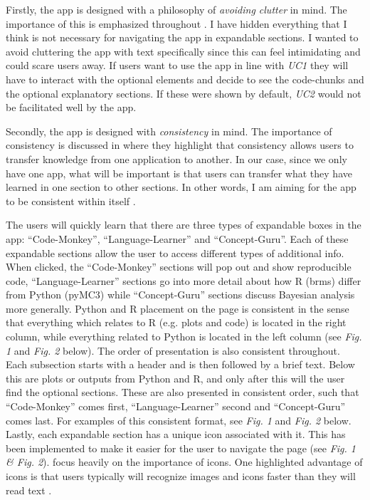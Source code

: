 \documentclass[12pt]{article}
\begin{document}
\vspace{5mm}

Firstly, the app is designed with a philosophy of \emph{avoiding clutter} in mind.
The importance of this is emphasized throughout \textcite{mills1992macintosh}.
I have hidden everything that I think is not necessary for navigating the app
in expandable sections. I wanted to avoid cluttering the
app with text specifically since this can feel intimidating and could scare users away.
If users want to use the app in line with \emph{UC1} they will have to interact with the optional
elements and decide to see the code-chunks and the optional explanatory sections.
If these were shown by default, \emph{UC2} would not be facilitated well by the app.

\vspace{5mm}

Secondly, the app is designed with \emph{consistency} in mind.
The importance of consistency is discussed in
\textcite[7]{mills1992macintosh}
where they highlight that consistency allows users to transfer knowledge from one
application to another. In our case, since we only have one app, what will be important is
that users can transfer what they have learned in one section to other sections.
In other words, I am aiming for the app to be consistent within itself
\autocite[8]{mills1992macintosh}.

\vspace{5mm}

The users will quickly learn that there are three types of expandable boxes in the app:
“Code-Monkey”, “Language-Learner” and “Concept-Guru”. Each of these expandable sections
allow the user to access different types of additional info. When clicked, the “Code-Monkey”
sections will pop out and show reproducible code, “Language-Learner” sections go into more detail
about how R (brms) differ from Python (pyMC3) while “Concept-Guru” sections discuss Bayesian analysis
more generally. Python and R placement on the page is consistent in the sense
that everything which relates to R (e.g. plots and code) is located in the
right column, while everything related to Python is located in the left column
(see \emph{Fig. 1} and \emph{Fig. 2} below).
The order of presentation is also consistent throughout.
Each subsection starts with a header and is then followed by a brief text.
Below this are plots or outputs from Python and R, and only after this will the user find
the optional sections. These are also presented in consistent order, such that “Code-Monkey” comes first,
“Language-Learner” second and “Concept-Guru” comes last. For examples of this
consistent format, see \emph{Fig. 1} and \emph{Fig. 2} below.
Lastly, each expandable section
has a unique icon associated with it. This has been implemented to make it easier for the
user to navigate the page (see \emph{Fig. 1 \& Fig. 2}). \textcite[223-255]{mills1992macintosh} focus
heavily on the importance of icons. One highlighted advantage of icons is that users typically
will recognize images and icons faster than they will read text
\autocite[244]{mills1992macintosh}.
\end{document}
